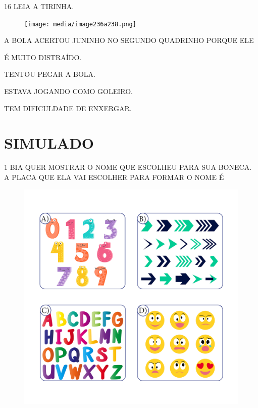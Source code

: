\pagebreak

\num{16} LEIA A TIRINHA.

\begin{figure}[H]
\texttt{[image: media/image236a238.png]}
\end{figure}


A BOLA ACERTOU JUNINHO NO SEGUNDO QUADRINHO PORQUE ELE

\begin{escolha}
\item É MUITO DISTRAÍDO.

\item TENTOU PEGAR A BOLA. 

\item ESTAVA JOGANDO COMO GOLEIRO.

\item TEM DIFICULDADE DE ENXERGAR.
\end{escolha}

\chapter[SIMULADO 4]{SIMULADO}

\pagebreak

\num{1} BIA QUER MOSTRAR O NOME QUE ESCOLHEU PARA SUA BONECA.
A PLACA QUE ELA VAI ESCOLHER PARA FORMAR O NOME É

\begin{figure}[H]
\includegraphics[width=\textwidth]{media/image239a242.png}
\end{figure}

